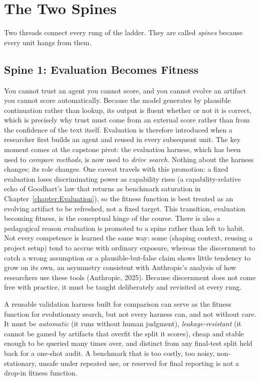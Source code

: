 \section{The Two Spines}
\label{section:TwoSpines}

Two threads connect every rung of the ladder.
They are called \emph{spines} because every unit hangs from them.

\subsection{Spine 1: Evaluation Becomes Fitness}

You cannot trust an agent you cannot score, and you cannot evolve an artifact you cannot score automatically.
Because the model generates by plausible continuation rather than lookup, its output is fluent whether or not it is correct, which is precisely why trust must come from an external score rather than from the confidence of the text itself.
Evaluation is therefore introduced when a researcher first builds an agent and reused in every subsequent unit.
The key moment comes at the capstone pivot: the evaluation harness, which has been used to \emph{compare methods}, is now used to \emph{drive search}.
Nothing about the harness changes; its role changes.
One caveat travels with this promotion: a fixed evaluation loses discriminating power as capability rises (a capability-relative echo of Goodhart's law that returns as benchmark saturation in Chapter~\ref{chapter:Evaluation}), so the fitness function is best treated as an evolving artifact to be refreshed, not a fixed target.
This transition, evaluation becoming fitness, is the conceptual hinge of the course.
There is also a pedagogical reason evaluation is promoted to a spine rather than left to habit.
Not every competence is learned the same way: some (shaping context, reusing a project setup) tend to accrue with ordinary exposure, whereas the discernment to catch a wrong assumption or a plausible-but-false claim shows little tendency to grow on its own, an asymmetry consistent with Anthropic's analysis of how researchers use these tools (Anthropic, 2025).
Because discernment does not come free with practice, it must be taught deliberately and revisited at every rung.

\begin{principle}
\label{principle:EvalFitness}
A reusable validation harness built for comparison can serve as the fitness function for evolutionary search, but not every harness can, and not without care.
It must be \emph{automatic} (it runs without human judgment), \emph{leakage-resistant} (it cannot be gamed by artifacts that overfit the split it scores), cheap and stable enough to be queried many times over, and distinct from any final-test split held back for a one-shot audit.
A benchmark that is too costly, too noisy, non-stationary, unsafe under repeated use, or reserved for final reporting is not a drop-in fitness function.
\end{principle}

